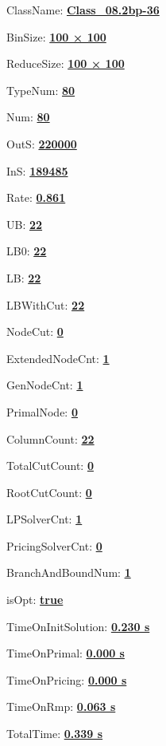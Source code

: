 \documentclass[11pt]{article}
\begin{document}
\pagestyle{empty}


ClassName: \underline{\textbf{Class_08.2bp-36}}
\par
BinSize: \underline{\textbf{100 × 100}}
\par
ReduceSize: \underline{\textbf{100 × 100}}
\par
TypeNum: \underline{\textbf{80}}
\par
Num: \underline{\textbf{80}}
\par
OutS: \underline{\textbf{220000}}
\par
InS: \underline{\textbf{189485}}
\par
Rate: \underline{\textbf{0.861}}
\par
UB: \underline{\textbf{22}}
\par
LB0: \underline{\textbf{22}}
\par
LB: \underline{\textbf{22}}
\par
LBWithCut: \underline{\textbf{22}}
\par
NodeCut: \underline{\textbf{0}}
\par
ExtendedNodeCnt: \underline{\textbf{1}}
\par
GenNodeCnt: \underline{\textbf{1}}
\par
PrimalNode: \underline{\textbf{0}}
\par
ColumnCount: \underline{\textbf{22}}
\par
TotalCutCount: \underline{\textbf{0}}
\par
RootCutCount: \underline{\textbf{0}}
\par
LPSolverCnt: \underline{\textbf{1}}
\par
PricingSolverCnt: \underline{\textbf{0}}
\par
BranchAndBoundNum: \underline{\textbf{1}}
\par
isOpt: \underline{\textbf{true}}
\par
TimeOnInitSolution: \underline{\textbf{0.230 s}}
\par
TimeOnPrimal: \underline{\textbf{0.000 s}}
\par
TimeOnPricing: \underline{\textbf{0.000 s}}
\par
TimeOnRmp: \underline{\textbf{0.063 s}}
\par
TotalTime: \underline{\textbf{0.339 s}}
\par
\newpage


\end{document}
